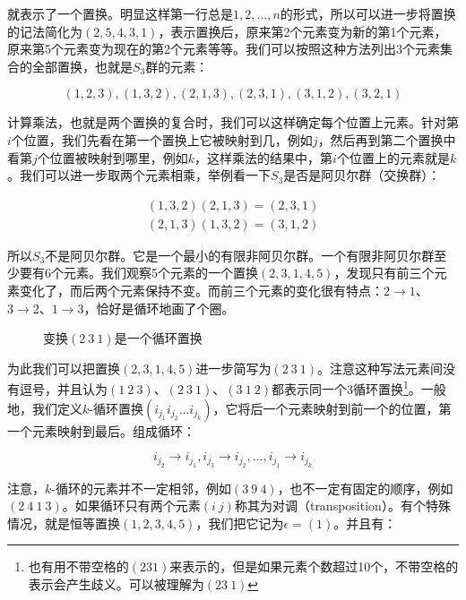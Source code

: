 \documentclass[b5paper]{ctexart}
\begin{document}
就表示了一个置换。明显这样第一行总是$1, 2, ..., n$的形式，所以可以进一步将置换的记法简化为$(2, 5, 4, 3, 1)$，表示置换后，原来第2个元素变为新的第1个元素，原来第5个元素变为现在的第2个元素等等。我们可以按照这种方法列出3个元素集合的全部置换，也就是$S_3$群的元素：

\[
(1, 2, 3), (1, 3, 2), (2, 1, 3), (2, 3, 1), (3, 1, 2), (3, 2, 1)
\]

计算乘法，也就是两个置换的复合时，我们可以这样确定每个位置上元素。针对第$i$个位置，我们先看在第一个置换上它被映射到几，例如$j$，然后再到第二个置换中看第$j$个位置被映射到哪里，例如$k$，这样乘法的结果中，第$i$个位置上的元素就是$k$。我们可以进一步取两个元素相乘，举例看一下$S_3$是否是阿贝尔群（交换群）：

\[
\begin{array}{l}
(1, 3, 2) (2, 1, 3) = (2, 3, 1) \\
(2, 1, 3) (1, 3, 2) = (3, 1, 2)
\end{array}
\]

所以$S_3$不是阿贝尔群。它是一个最小的有限非阿贝尔群。一个有限非阿贝尔群至少要有6个元素。我们观察5个元素的一个置换$(2, 3, 1, 4, 5)$，发现只有前三个元素变化了，而后两个元素保持不变。而前三个元素的变化很有特点：$2 \to 1$、$3 \to 2$、$1 \to 3$，恰好是循环地画了个圈。

\begin{figure}[htbp]
\centering
{}
\caption{变换$(2\ 3\ 1)$是一个循环置换}
\label{fig:cycle-permutation}
\end{figure}

为此我们可以把置换$(2, 3, 1, 4, 5)$进一步简写为$(2\ 3\ 1)$。注意这种写法元素间没有逗号，并且认为$(1\ 2\ 3)$、$(2\ 3\ 1)$、$(3\ 1\ 2)$都表示同一个3循环置换\footnote{也有用不带空格的$(231)$来表示的，但是如果元素个数超过10个，不带空格的表示会产生歧义。可以被理解为$(23\ 1)$}。一般地，我们定义$k$-循环置换$(i_{j_1} i_{j_2} ... i_{j_k})$，它将后一个元素映射到前一个的位置，第一个元素映射到最后。组成循环：

\[
i_{j_2} \to i_{j_1}, i_{j_3} \to i_{j_2}, ..., i_{j_1} \to i_{j_k}
\]

注意，$k$-循环的元素并不一定相邻，例如$(3\ 9\ 4)$，也不一定有固定的顺序，例如$(2\ 4\ 1\ 3)$。如果循环只有两个元素$(i\ j)$称其为对调（transposition）。有个特殊情况，就是恒等置换$(1, 2, 3, 4, 5)$，我们把它记为$\epsilon = (1)$。并且有：
\end{document}
